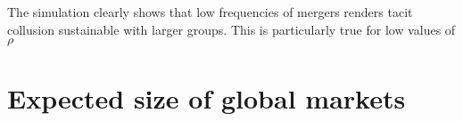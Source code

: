 \documentclass[american]{scrartcl}
\begin{document}
The simulation clearly shows that low frequencies of mergers renders tacit collusion sustainable with larger groups. This is particularly true for low values of $\rho$

\newpage
\nocite{*}
\printbibliography

\newpage
\appendix

\section{Expected size of global markets}
\end{document}
